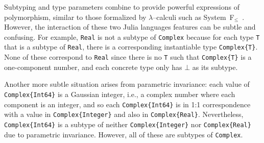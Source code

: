 \documentclass[pldi]{sigplanconf-pldi15}
\begin{document}
Subtyping and type parameters combine to provide powerful expressions of
polymorphism, similar to those formalized by $\lambda$--calculi such as
System~F$_\le$~\cite{Cardelli1985}. However, the interaction of these two
Julia languages features can be subtle and confusing. For example, \verb|Real|
is not a subtype of \verb|Complex| because for each type \verb|T| that is a
subtype of \verb|Real|, there is a corresponding instantiable type
\verb|Complex{T}|. None of these correspond to \verb|Real| since there is no
\verb|T| such that \verb|Complex{T}| is a one-component number, and each
concrete type only has $\bot$ as its subtype.

Another more subtle situation arises from parametric invariance: each value of
\verb|Complex{Int64}| is a Gaussian integer, i.e., a complex number where each
component is an integer, and so each \verb|Complex{Int64}| is in 1:1
correspondence with a value in \verb|Complex{Integer}| and also in
\verb|Complex{Real}|. Nevertheless, \verb|Complex{Int64}| is a subtype of
neither \verb|Complex{Integer}| nor \verb|Complex{Real}| due to parametric
invariance. However, all of these are subtypes of \verb|Complex|.





\end{document}
